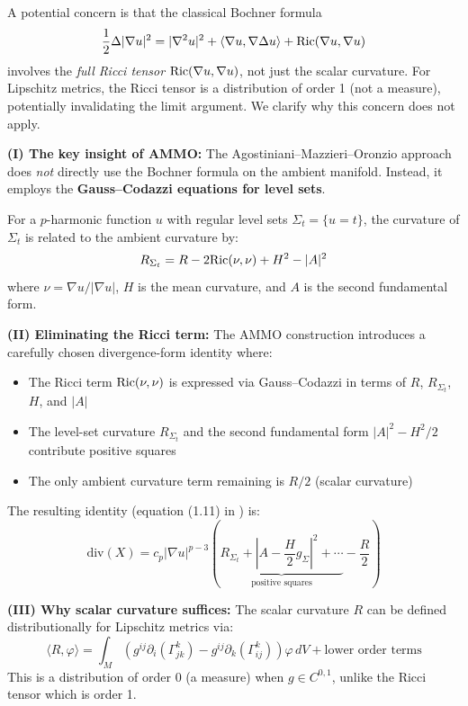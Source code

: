 \begin{remark}\label{rem:WhyNoRicci}
A potential concern is that the classical Bochner formula
\[
\frac{1}{2}\Delta|\nabla u|^2 = |\nabla^2 u|^2 + \langle \nabla u, \nabla \Delta u \rangle + \mathrm{Ric}(\nabla u, \nabla u)
\]
involves the \emph{full Ricci tensor} $\mathrm{Ric}(\nabla u, \nabla u)$, not just the scalar curvature. For Lipschitz metrics, the Ricci tensor is a distribution of order 1 (not a measure), potentially invalidating the limit argument. We clarify why this concern does not apply.

\textbf{(I) The key insight of AMMO:} The Agostiniani--Mazzieri--Oronzio approach \cite{amo2024} does \emph{not} directly use the Bochner formula on the ambient manifold. Instead, it employs the \textbf{Gauss--Codazzi equations for level sets}.

For a $p$-harmonic function $u$ with regular level sets $\Sigma_t = \{u = t\}$, the curvature of $\Sigma_t$ is related to the ambient curvature by:
\[
R_{\Sigma_t} = R - 2\mathrm{Ric}(\nu, \nu) + H^2 - |A|^2
\]
where $\nu = \nabla u / |\nabla u|$, $H$ is the mean curvature, and $A$ is the second fundamental form.

\textbf{(II) Eliminating the Ricci term:} The AMMO construction introduces a carefully chosen divergence-form identity where:
\begin{itemize}
    \item The Ricci term $\mathrm{Ric}(\nu, \nu)$ is expressed via Gauss--Codazzi in terms of $R$, $R_{\Sigma_t}$, $H$, and $|A|$
    \item The level-set curvature $R_{\Sigma_t}$ and the second fundamental form $|A|^2 - H^2/2$ contribute positive squares
    \item The only ambient curvature term remaining is $R/2$ (scalar curvature)
\end{itemize}

The resulting identity (equation (1.11) in \cite{amo2024}) is:
\[
\text{div}(X) = c_p |\nabla u|^{p-3} \left( \underbrace{R_{\Sigma_t} + |A - \frac{H}{2}g_\Sigma|^2 + \cdots}_{\text{positive squares}} - \frac{R}{2} \right)
\]

\textbf{(III) Why scalar curvature suffices:} The scalar curvature $R$ can be defined distributionally for Lipschitz metrics via:
\[
\langle R, \varphi \rangle = \int_M \left( g^{ij}\partial_i(\Gamma^k_{jk}) - g^{ij}\partial_k(\Gamma^k_{ij}) \right) \varphi \, dV + \text{lower order terms}
\]
This is a distribution of order 0 (a measure) when $g \in C^{0,1}$, unlike the Ricci tensor which is order 1.


\end{remark}
